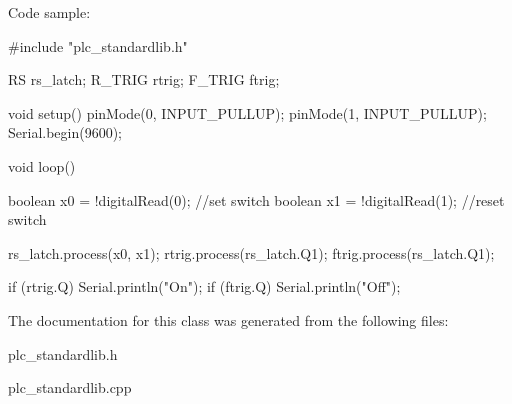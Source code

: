 Code sample\+: \begin{DoxyVerb}#include "plc_standardlib.h"

RS rs_latch;
R_TRIG rtrig;
F_TRIG ftrig;

void setup() {
    pinMode(0, INPUT_PULLUP);
    pinMode(1, INPUT_PULLUP);
    Serial.begin(9600);
}

void loop() {
    boolean x0 = !digitalRead(0); //set switch
    boolean x1 = !digitalRead(1); //reset switch

    rs_latch.process(x0, x1);
    rtrig.process(rs_latch.Q1);
    ftrig.process(rs_latch.Q1);

    if (rtrig.Q) {
        Serial.println("On");
    }
    if (ftrig.Q) {
        Serial.println("Off");
    }
}\end{DoxyVerb}
 

The documentation for this class was generated from the following files\+:\begin{DoxyCompactItemize}
\item 
plc\+\_\+standardlib.\+h\item 
plc\+\_\+standardlib.\+cpp\end{DoxyCompactItemize}
